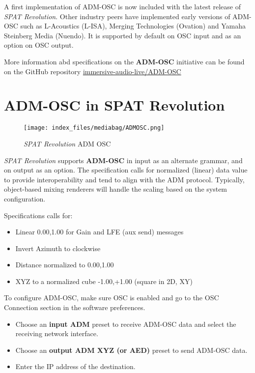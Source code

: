 \documentclass[
  letterpaper,
  DIV=11,
  numbers=noendperiod]{scrreport}
\providecommand{\tightlist}{%
  \setlength{\itemsep}{0pt}\setlength{\parskip}{0pt}}\usepackage{longtable,booktabs,array}
\begin{document}
A first implementation of ADM-OSC is now included with the latest
release of \emph{SPAT Revolution}. Other industry peers have implemented
early versions of ADM-OSC such as L-Acoustics (L-ISA), Merging
Technologies (Ovation) and Yamaha Steinberg Media (Nuendo). It is
supported by default on OSC input and as an option on OSC output.

More information abd specifications on the \textbf{ADM-OSC} initiative
can be found on the GitHub repository
\href{https://github.com/immersive-audio-live/ADM-OSC}{immersive-audio-live/ADM-OSC}

\hypertarget{adm-osc-in-spat-revolution}{%
\section{ADM-OSC in SPAT Revolution}\label{adm-osc-in-spat-revolution}}

\begin{figure}

{\centering \texttt{[image: index\_files/mediabag/ADMOSC.png]}

}

\caption{\emph{SPAT Revolution} ADM OSC}

\end{figure}

\emph{SPAT Revolution} supports \textbf{ADM-OSC} in input as an
alternate grammar, and on output as an option. The specification calls
for normalized (linear) data value to provide interoperability and tend
to align with the ADM protocol. Typically, object-based mixing renderers
will handle the scaling based on the system configuration.

Specifications calls for:

\begin{itemize}
\tightlist
\item
  Linear 0.00,1.00 for Gain and LFE (aux send) messages
\item
  Invert Azimuth to clockwise
\item
  Distance normalized to 0.00,1.00
\item
  XYZ to a normalized cube -1.00,+1.00 (square in 2D, XY)
\end{itemize}

To configure ADM-OSC, make sure OSC is enabled and go to the OSC
Connection section in the software preferences.

\begin{itemize}
\item
  Choose an \textbf{input \textbar{} ADM} preset to receive ADM-OSC data
  and select the receiving network interface.
\item
  Choose an \textbf{output \textbar{} ADM XYZ (or AED)} preset to send
  ADM-OSC data.
\item
  Enter the IP address of the destination.
\end{itemize}
\end{document}
